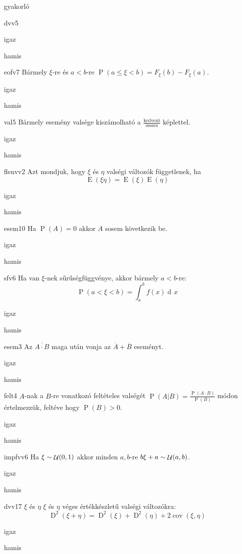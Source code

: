 \documentclass[12pt]{article}
\DeclareMathOperator{\E}{E}
\DeclareMathOperator{\D}{D}
\renewcommand{\P}{\operatorname{P}}
\renewcommand{\d}{\operatorname{d\! }} %
\DeclareMathOperator{\Unif}{{\cal U}}
\DeclareMathOperator{\cov}{cov}
\begin{document}
\begin{quiz}{gyakorló}
\begin{multi}{dvv5}
\item* igaz
\item hamis
\end{multi}
\begin{multi}{eofv7}
Bármely $\xi$-re és $a<b$-re $\P(a\le \xi <b)=F_{\xi}(b)-F_{\xi}(a)$.
\item* igaz
\item hamis
\end{multi}
\begin{multi}{val5}
Bármely esemény valsége kiszámolható a $\frac{\text{kedvező}}{\text{összes}}$ képlettel.
\item igaz
\item* hamis
\end{multi}
\begin{multi}{flenvv2}
Azt mondjuk, hogy $\xi$ és $\eta$ valségi változók függetlenek, ha
$$
\E(\xi \eta)=\E(\xi)\E(\eta)
$$
\item igaz
\item* hamis
\end{multi}
\begin{multi}{esem10}
Ha $\P(A)=0$ akkor $A$ sosem következik be.
\item igaz
\item* hamis
\end{multi}
\begin{multi}{sfv6}
Ha van $\xi$-nek sűrűségfüggvénye, akkor bármely $a<b$-re:
$$
\P(a<\xi<b)=\int_{a}^{b}f(x)\d x
$$
\item* igaz
\item hamis
\end{multi}
\begin{multi}{esem3}
Az $\overline{A\cdot B}$ maga után vonja az $\overline{A} + \overline{B}$ eseményt.
\item* igaz
\item hamis
\end{multi}
\begin{multi}{felt4}
$A$-nak a $B$-re vonatkozó feltételes valségét $\P(A|B)=\frac{\P(A\cdot B)}{\P(B)}$ módon értelmezzük, feltéve hogy $\P(B)>0$.
\item* igaz
\item hamis
\end{multi}
\begin{multi}{impfvv6}
Ha $\xi\sim \Unif(0,1)$ akkor  minden $a,b$-re $b\xi+a\sim \Unif(a,b)$.
\item igaz
\item* hamis
\end{multi}
\begin{multi}{dvv17}
$\xi$ és $\eta$ $\xi$ és $\eta$ véges értékkészletű valségi változókra:
$$
\D^2(\xi+\eta)=\D^2(\xi)+\D^2(\eta)+2\cov(\xi,\eta)
$$
\item* igaz
\item hamis
\end{multi}
\end{quiz}
\end{document}

